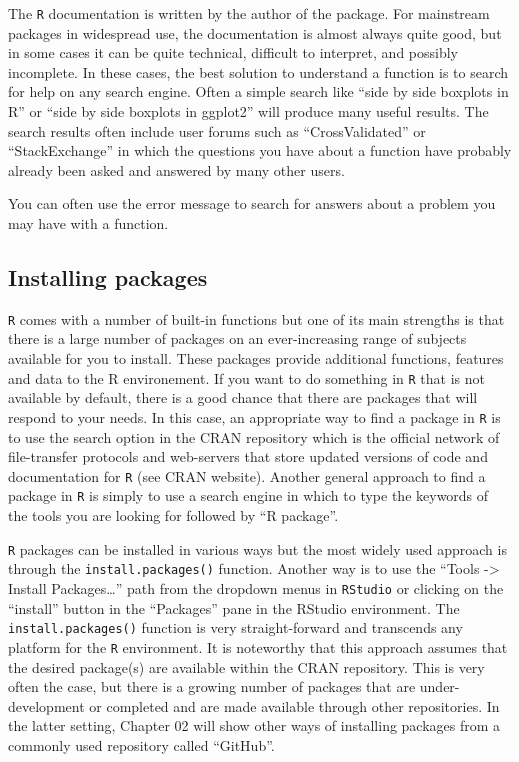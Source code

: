 \documentclass[12pt,]{krantz}
\let\BeginKnitrBlock\begin \let\EndKnitrBlock\end
\begin{document}
The \texttt{R} documentation is written by the author of the package.
For mainstream packages in widespread use, the documentation is almost
always quite good, but in some cases it can be quite technical,
difficult to interpret, and possibly incomplete. In these cases, the
best solution to understand a function is to search for help on any
search engine. Often a simple search like ``side by side boxplots in R''
or ``side by side boxplots in ggplot2'' will produce many useful
results. The search results often include user forums such as
``CrossValidated'' or ``StackExchange'' in which the questions you have
about a function have probably already been asked and answered by many
other users.

\BeginKnitrBlock{rmdtip}
You can often use the error message to search for answers about a
problem you may have with a function.
\EndKnitrBlock{rmdtip}

\subsection{Installing packages}\label{installing-packages}

\texttt{R} comes with a number of built-in functions but one of its main
strengths is that there is a large number of packages on an
ever-increasing range of subjects available for you to install. These
packages provide additional functions, features and data to the R
environement. If you want to do something in \texttt{R} that is not
available by default, there is a good chance that there are packages
that will respond to your needs. In this case, an appropriate way to
find a package in \texttt{R} is to use the search option in the CRAN
repository which is the official network of file-transfer protocols and
web-servers that store updated versions of code and documentation for
\texttt{R} (see CRAN website). Another general approach to find a
package in \texttt{R} is simply to use a search engine in which to type
the keywords of the tools you are looking for followed by ``R package''.

\texttt{R} packages can be installed in various ways but the most widely
used approach is through the \texttt{install.packages()} function.
Another way is to use the ``Tools -\textgreater{} Install
Packages\ldots{}'' path from the dropdown menus in \texttt{RStudio} or
clicking on the ``install'' button in the ``Packages'' pane in the
RStudio environment. The \texttt{install.packages()} function is very
straight-forward and transcends any platform for the \texttt{R}
environment. It is noteworthy that this approach assumes that the
desired package(s) are available within the CRAN repository. This is
very often the case, but there is a growing number of packages that are
under-development or completed and are made available through other
repositories. In the latter setting, Chapter 02 will show other ways of
installing packages from a commonly used repository called ``GitHub''.
\end{document}
